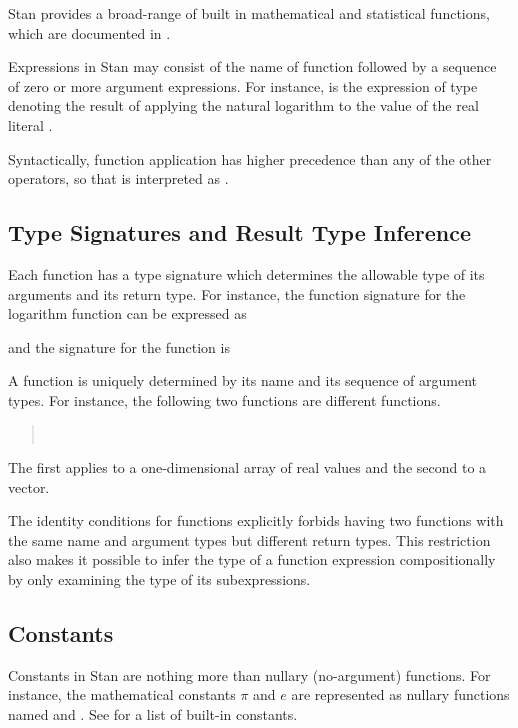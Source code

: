 Stan provides a broad-range of built in mathematical and statistical
functions, which are documented in .

Expressions in Stan may consist of the name of function followed by a
sequence of zero or more argument expressions.  For instance,
 is the expression of type  denoting the
result of applying the natural logarithm to the value of the real
literal .

Syntactically, function application has higher precedence than any of
the other operators, so that  is interpreted as
.

\subsection{Type Signatures and Result Type Inference}

Each function has a type signature which determines the allowable type
of its arguments and its return type.  For instance, the function
signature for the logarithm function can be expressed as
%
\begin{quote}
\end{quote}
%
and the signature for the  function is
%
\begin{quote}
\end{quote}
%
A function is uniquely determined by its name and its sequence of
argument types.  For instance, the following two functions are
different functions.
%
\begin{quote}
\\
\end{quote}
%
The first applies to a one-dimensional array of real values and the
second to a vector.

The identity conditions for functions explicitly forbids having two
functions with the same name and argument types but different return
types.  This restriction also makes it possible to infer the type of a
function expression compositionally by only examining the type of its
subexpressions. 

\subsection{Constants}

Constants in Stan are nothing more than nullary (no-argument)
functions.  For instance, the mathematical constants $\pi$ and $e$ are
represented as nullary functions named  and .
See  for a list of built-in constants.

